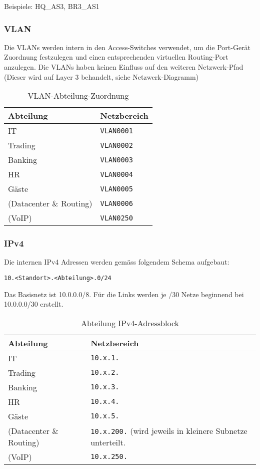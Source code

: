Beispiele: HQ\_AS3, BR3\_AS1

\subsubsection{VLAN}
Die VLANs werden intern in den Access-Switches verwendet, um die Port-Gerät Zuordnung festzulegen und einen entsprechenden virtuellen Routing-Port anzulegen. Die VLANs haben keinen Einfluss auf den weiteren Netzwerk-Pfad (Dieser wird auf Layer 3 behandelt, siehe Netzwerk-Diagramm)

\begin{table}[h]
	\centering
	\begin{tabu}{l l}
		\toprule
		Abteilung & Netzbereich \\
		\midrule
		IT & \lstinline|VLAN0001|\\
		Trading & \lstinline|VLAN0002| \\
		Banking & \lstinline|VLAN0003|\\
		HR & \lstinline|VLAN0004|\\
		Gäste & \lstinline|VLAN0005|\\
		(Datacenter \& Routing) & \lstinline|VLAN0006|\\
		(VoIP) & \lstinline|VLAN0250|\\
		\bottomrule
	\end{tabu}
	\label{tbl:vlans}
	\caption{VLAN-Abteilung-Zuordnung}
\end{table}


\subsubsection{IPv4}
Die internen IPv4 Adressen werden gemäss folgendem Schema aufgebaut: 

 \lstinline|10.<Standort>.<Abteilung>.0/24|
 
 Das Basisnetz ist 10.0.0.0/8. Für die Links werden je /30 Netze beginnend bei 10.0.0.0/30 erstellt.
 
\begin{table}[h]
	\centering
  \begin{tabu}{l l}
  	\toprule
  	Abteilung & Netzbereich \\
  	\midrule
  	IT & \lstinline|10.x.1.|\\
  	Trading & \lstinline|10.x.2.|\\
  	Banking & \lstinline|10.x.3.|\\
  	HR & \lstinline|10.x.4.|\\
 	Gäste & \lstinline|10.x.5.|\\
 	(Datacenter \& Routing) & \lstinline|10.x.200.| (wird jeweils in kleinere Subnetze unterteilt.\\
 	(VoIP) & \lstinline|10.x.250.|\\
 	\bottomrule
  \end{tabu}
  \label{tbl:abteilung_ipv4_adressblock}
  \caption{Abteilung IPv4-Adressblock}
\end{table}

